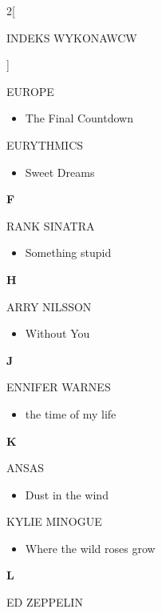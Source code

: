 \documentclass[a4paper]{report}
\begin{document}
\begin{multicols*}{2}[\begin{Huge}INDEKS WYKONAWCW\end{Huge}\vspace{1cm}]
\begin{itemize}[topsep=0pt]
\end{itemize}
 EUROPE 
\begin{itemize}[topsep=0pt]
\itemsep0em
\item[]  The Final Countdown   \\
\end{itemize}
 EURYTHMICS 
\begin{itemize}[topsep=0pt]
\itemsep0em
\item[]  Sweet Dreams   \\
\end{itemize}
 \begin{Large}\textbf{F}\end{Large}RANK SINATRA 
\begin{itemize}[topsep=0pt]
\itemsep0em
\item[]  Something stupid   \\
\end{itemize}
 \begin{Large}\textbf{H}\end{Large}ARRY NILSSON 
\begin{itemize}[topsep=0pt]
\itemsep0em
\item[]  Without You   \\
\end{itemize}
 \begin{Large}\textbf{J}\end{Large}ENNIFER WARNES 
\begin{itemize}[topsep=0pt]
\itemsep0em
\item[]  the time of my life   \\
\end{itemize}
 \begin{Large}\textbf{K}\end{Large}ANSAS 
\begin{itemize}[topsep=0pt]
\itemsep0em
\item[]  Dust in the wind   \\
\end{itemize}
 KYLIE MINOGUE 
\begin{itemize}[topsep=0pt]
\itemsep0em
\item[]  Where the wild roses grow   \\
\end{itemize}
 \begin{Large}\textbf{L}\end{Large}ED ZEPPELIN 
\begin{itemize}[topsep=0pt]

\end{itemize}
\end{multicols*}
\end{document}
